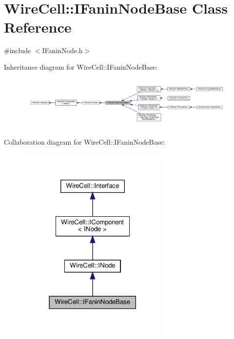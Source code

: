 \hypertarget{class_wire_cell_1_1_i_fanin_node_base}{}\section{Wire\+Cell\+:\+:I\+Fanin\+Node\+Base Class Reference}
\label{class_wire_cell_1_1_i_fanin_node_base}


{\ttfamily \#include $<$I\+Fanin\+Node.\+h$>$}



Inheritance diagram for Wire\+Cell\+:\+:I\+Fanin\+Node\+Base\+:
\nopagebreak
\begin{figure}[H]
\begin{center}
\leavevmode
\includegraphics[width=350pt]{class_wire_cell_1_1_i_fanin_node_base__inherit__graph}
\end{center}
\end{figure}


Collaboration diagram for Wire\+Cell\+:\+:I\+Fanin\+Node\+Base\+:
\nopagebreak
\begin{figure}[H]
\begin{center}
\leavevmode
\includegraphics[width=213pt]{class_wire_cell_1_1_i_fanin_node_base__coll__graph}
\end{center}
\end{figure}
